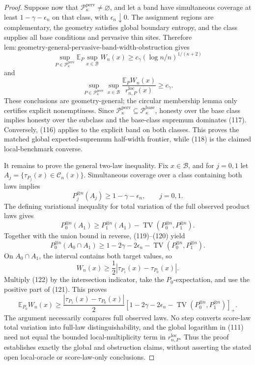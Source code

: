 \documentclass{article}
\begin{document}
\begin{proof}
Suppose now that \(\mathcal P_\kappa^{\mathrm{perv}}\ne\varnothing\),
and let a band have simultaneous coverage at least
\(1-\gamma-\epsilon_n\) on that class, with \(\epsilon_n\downarrow0\).
The assignment regions are complementary, the geometry satisfies global
boundary entropy, and the class supplies all base conditions and
pervasive thin sites.  Therefore
\(\mathrm{lem:geometry\text{-}general\text{-}pervasive\text{-}band\text{-}width\text{-}obstruction}\)
gives
\[
 \sup_{P\in\mathcal P_\kappa^{\mathrm{perv}}}
 \mathbb E_P\sup_{x\in\mathcal B}W_n(x)
 \ge c_\gamma(\log n/n)^{1/(\kappa+2)}
 \tag{117}
\]
and
\[
 \sup_{P\in\mathcal P_\kappa^{\mathrm{perv}}}
 \sup_{x\in\mathcal B}
 \frac{\mathbb E_PW_n(x)}{r_{n,P}^{\mathrm{loc}}(x)}
 \ge c_\gamma.
 \tag{118}
\]
These conclusions are geometry-general; the circular membership lemma
only certifies explicit nonemptiness.  Since
\(\mathcal P_\kappa^{\mathrm{perv}}\subseteq
\mathcal P_\kappa^{\mathrm{base}}\), honesty over the base class implies
honesty over the subclass and the base-class supremum dominates (117).
Conversely, (116) applies to the explicit band on both classes.  This
proves the matched global expected-supremum half-width frontier, while
(118) is the claimed local-benchmark converse.

It remains to prove the general two-law inequality.  Fix
\(x\in\mathcal B\), and for \(j=0,1\) let
\(A_j=\{\tau_{P_j}(x)\in\mathcal C_n(x)\}\).  Simultaneous coverage over
a class containing both laws implies
\[
 P_j^{\otimes n}(A_j)\ge1-\gamma-\epsilon_n,
 \qquad j=0,1.
 \tag{119}
\]
The defining variational inequality for total variation of the full
observed product laws gives
\[
 P_0^{\otimes n}(A_1)
 \ge P_1^{\otimes n}(A_1)
 -\operatorname{TV}(P_0^{\otimes n},P_1^{\otimes n}).
 \tag{120}
\]
Together with the union bound in reverse, (119)--(120) yield
\[
 P_0^{\otimes n}(A_0\cap A_1)
 \ge1-2\gamma-2\epsilon_n
 -\operatorname{TV}(P_0^{\otimes n},P_1^{\otimes n}).
 \tag{121}
\]
On \(A_0\cap A_1\), the interval contains both target values, so
\[
 W_n(x)\ge\frac12|\tau_{P_1}(x)-\tau_{P_0}(x)|.
 \tag{122}
\]
Multiply (122) by the intersection indicator, take the
\(P_0\)-expectation, and use the positive part of (121).  This proves
\[
 \mathbb E_{P_0}W_n(x)\ge
 \frac{|\tau_{P_1}(x)-\tau_{P_0}(x)|}{2}
 \left[1-2\gamma-2\epsilon_n-
 \operatorname{TV}(P_0^{\otimes n},P_1^{\otimes n})\right]_+.
\]
The argument necessarily compares full observed laws.  No step converts
score-law total variation into full-law distinguishability, and the
global logarithm in (111) need not equal the bounded local-multiplicity
term in \(r_{n,P}^{\mathrm{loc}}\).  Thus the proof establishes exactly
the global and obstruction claims, without asserting the stated open
local-oracle or score-law-only conclusions.
\end{proof}
\end{document}
